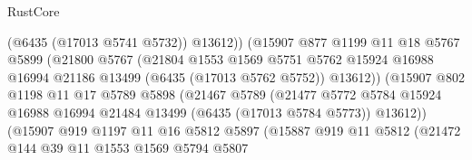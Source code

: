 \begin{lexlean}{RustCore}
\begin{coremodule}
                                  (@6435 (@17013 @5741 @5732))
                                  @13612))
                              (@15907
                                @877
                                @1199
                                @11
                                @18
                                @5767
                                @5899
                                (@21800
                                  @5767
                                  (@21804
                                    @1553
                                    @1569
                                    @5751
                                    @5762
                                    @15924
                                    @16988
                                    @16994
                                    @21186
                                    @13499
                                    (@6435 (@17013 @5762 @5752))
                                    @13612))
                                (@15907
                                  @802
                                  @1198
                                  @11
                                  @17
                                  @5789
                                  @5898
                                  (@21467
                                    @5789
                                    (@21477
                                      @5772
                                      @5784
                                      @15924
                                      @16988
                                      @16994
                                      @21484
                                      @13499
                                      (@6435 (@17013 @5784 @5773))
                                      @13612))
                                  (@15907
                                    @919
                                    @1197
                                    @11
                                    @16
                                    @5812
                                    @5897
                                    (@15887
                                      @919
                                      @11
                                      @5812
                                      (@21472
                                        @144
                                        @39
                                        @11
                                        @1553
                                        @1569
                                        @5794
                                        @5807

\end{coremodule}
\end{lexlean}
